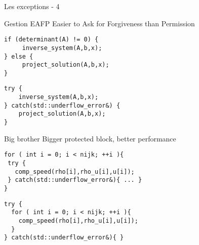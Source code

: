 \documentclass[handout,10pt]{beamer}
\begin{document}
\begin{frame}[fragile]{Les exceptions - 4}
\tiny
\begin{block}{Gestion EAFP}
Easier to Ask for Forgiveness than Permission
\begin{minipage}{0.49\textwidth}
\begin{lstlisting}
if (determinant(A) != 0) {
     inverse_system(A,b,x);
} else {
     project_solution(A,b,x);
}
\end{lstlisting}
\end{minipage}
\begin{minipage}{0.49\textwidth}
\begin{lstlisting}
try {
    inverse_system(A,b,x);
} catch(std::underflow_error&) {
    project_solution(A,b,x);
}
\end{lstlisting}
\end{minipage}
\end{block}

\begin{block}{Big brother}
Bigger protected block, better performance
\begin{minipage}{0.49\textwidth}
\begin{lstlisting}
for ( int i = 0; i < nijk; ++i ){
 try {
   comp_speed(rho[i],rho_u[i],u[i]);
 } catch(std::underflow_error&){ ... }
}
\end{lstlisting}
\end{minipage}
\begin{minipage}{0.49\textwidth}
\begin{lstlisting}
try {
  for ( int i = 0; i < nijk; ++i ){ 
    comp_speed(rho[i],rho_u[i],u[i]);
  }
} catch(std::underflow_error&){ }
\end{lstlisting}
\end{minipage}
\end{block} 
\end{frame}
\end{document}
